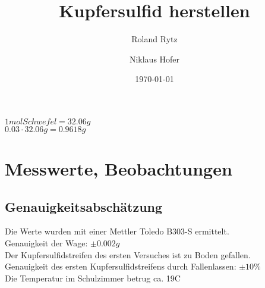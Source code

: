\documentclass[11pt,paper=a4,final]{scrartcl}
\title{Kupfersulfid herstellen}
\author{Roland Rytz \and Niklaus Hofer}
\date{\today{}}
\begin{document}
\maketitle
\newpage
\( 1mol Schwefel = 32.06g \)\\
\( 0.03 \cdot 32.06g = 0.9618g \)
\section{Messwerte, Beobachtungen}
\subsection{Genauigkeitsabsch\"atzung}
Die Werte wurden mit einer Mettler Toledo B303-S ermittelt.\\
Genauigkeit der Wage: \(\pm 0.002g\)\\
Der Kupfersulfidstreifen des ersten Versuches ist zu Boden gefallen. \\
Genauigkeit des ersten Kupfersulfidstreifens durch Fallenlassen: \(\pm 10\% \)\\
Die Temperatur im Schulzimmer betrug ca. 19\textdegree C
\end{document}
